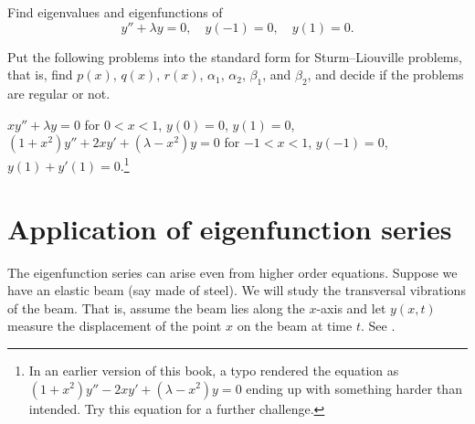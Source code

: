 \setcounter{exercise}{100}

\begin{exercise}
Find eigenvalues and eigenfunctions of
\begin{equation*}
y'' + \lambda y = 0, \quad y(-1) = 0, \quad y(1) = 0 .
\end{equation*}
\end{exercise}

\begin{exercise}
Put the following problems into the standard form for Sturm--Liouville
problems, that is, find $p(x)$, $q(x)$, $r(x)$,
$\alpha_1$,
$\alpha_2$,
$\beta_1$, and
$\beta_2$,
and decide if the problems are regular or not.
\begin{tasks}
\task $x y'' + \lambda y = 0$ for $0 < x < 1$, $y(0) = 0$, $y(1) = 0$,
\task
$(1+x^2) y'' + 2xy' + (\lambda-x^2) y = 0$ for $-1 < x < 1$, $y(-1) = 0$, $y(1)+y'(1) =
0$.\footnote{In an earlier version of this book, a typo rendered the equation
as $(1+x^2) y'' - 2xy' + (\lambda-x^2) y = 0$ ending up with something
harder than intended.  Try this equation for a further challenge.}
\end{tasks}
\end{exercise}


\sectionnewpage
\section{Application of eigenfunction series}
\label{sec:appeig}


The eigenfunction series can arise even from higher order equations.
Suppose we have an elastic beam (say made of steel).  We will study the
transversal vibrations of the beam.  That is, assume the beam lies along
the $x$-axis and let $y(x,t)$ measure the displacement of the point $x$
on the beam at time $t$.  See .

